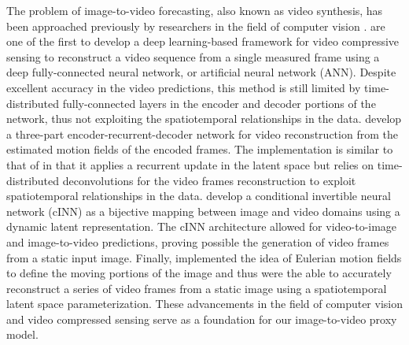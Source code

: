 \documentclass[10pt, twoside]{article}
\begin{document}
The problem of image-to-video forecasting, also known as video synthesis, has been approached previously by researchers in the field of computer vision \cite{vondrick2016generating, mathieu2016deep, villegas2018decomposing, tulyakov2017mocogan, NIPS2015_07563a3f}. \citet{iliadis2017deep} are one of the first to develop a deep learning-based framework for video compressive sensing to reconstruct a video sequence from a single measured frame using a deep fully-connected neural network, or artificial neural network (ANN). Despite excellent accuracy in the video predictions, this method is still limited by time-distributed fully-connected layers in the encoder and decoder portions of the network, thus not exploiting the spatiotemporal relationships in the data. \citet{xu2018csvideonet} develop a three-part encoder-recurrent-decoder network for video reconstruction from the estimated motion fields of the encoded frames. The implementation is similar to that of \cite{Tang2020, Tang2021, Jiang2023} in that it applies a recurrent update in the latent space but relies on time-distributed deconvolutions for the video frames reconstruction to exploit spatiotemporal relationships in the data. \citet{dorkenwald2021stochastic} develop a conditional invertible neural network (cINN) as a bijective mapping between image and video domains using a dynamic latent representation. The cINN architecture allowed for video-to-image and image-to-video predictions, proving possible the generation of video frames from a static input image. Finally, \citet{holynski2020animating} implemented the idea of Eulerian motion fields to define the moving portions of the image and thus were the able to accurately reconstruct a series of video frames from a static image using a spatiotemporal latent space parameterization. These advancements in the field of computer vision and video compressed sensing serve as a foundation for our image-to-video proxy model.
\end{document}
